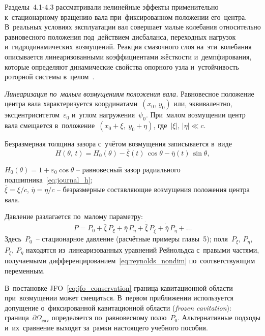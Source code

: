 
Разделы~4.1-4.3 рассматривали нелинейные эффекты применительно к~стационарному вращению вала при~фиксированном положении его~центра. В~реальных условиях эксплуатации вал совершает малые колебания относительно равновесного положения под~действием дисбаланса, переходных нагрузок и~гидродинамических возмущений. Реакция смазочного слоя на~эти~колебания описывается линеаризованными коэффициентами жёсткости и~демпфирования, которые определяют динамические свойства опорного узла и~устойчивость роторной системы в~целом~\cite{goodwin1997,jang1999,sayed2022,muszynska1988,weissbacher2014}.

\textit{Линеаризация по~малым возмущениям положения вала.}
Равновесное положение центра вала характеризуется координатами~$(x_0,\,y_0)$ или, эквивалентно, эксцентриситетом~$\varepsilon_0$ и~углом нагружения~$\psi_0$. При~малом возмущении центр вала смещается в~положение~$(x_0 + \xi,\; y_0 + \eta)$, где~$|\xi|,\,|\eta| \ll c$.

Безразмерная толщина зазора с~учётом возмущения записывается в~виде
\begin{equation}
  H(\theta,\,t) = H_0(\theta)
    - \bar{\xi}(t)\,\cos\theta
    - \bar{\eta}(t)\,\sin\theta,
  \label{eq:H_perturbed}
\end{equation}
\begin{conditions}
$H_0(\theta) = 1 + \varepsilon_0\cos\theta$ -- равновесный зазор радиального подшипника~\eqref{eq:journal_h};\\
$\bar{\xi} = \xi/c$,\; $\bar{\eta} = \eta/c$ -- безразмерные составляющие возмущения положения центра вала.
\end{conditions}
Давление разлагается по~малому параметру:
\begin{equation}
  P = P_0
    + \bar{\xi}\,P_{\xi}
    + \bar{\eta}\,P_{\eta}
    + \dot{\bar{\xi}}\,P_{\dot\xi}
    + \dot{\bar{\eta}}\,P_{\dot\eta}
    + \ldots
  \label{eq:P_expansion}
\end{equation}
Здесь~$P_0$~-- стационарное давление (расчётные примеры главы~5); поля~$P_{\xi}$, $P_{\eta}$, $P_{\dot\xi}$, $P_{\dot\eta}$ находятся из~линеаризованных уравнений Рейнольдса с~правыми частями, получаемыми дифференцированием~\eqref{eq:reynolds_nondim} по~соответствующим переменным.

В~постановке JFO~\eqref{eq:jfo_conservation} граница кавитационной области при~возмущении может смещаться. В~первом приближении используется допущение о~фиксированной кавитационной области (\textit{frozen cavitation}): граница~$\partial\Omega_{\mathrm{cav}}$ определяется по~равновесному полю~$P_0$. Альтернативные подходы и~их~сравнение выходят за~рамки настоящего учебного пособия.

